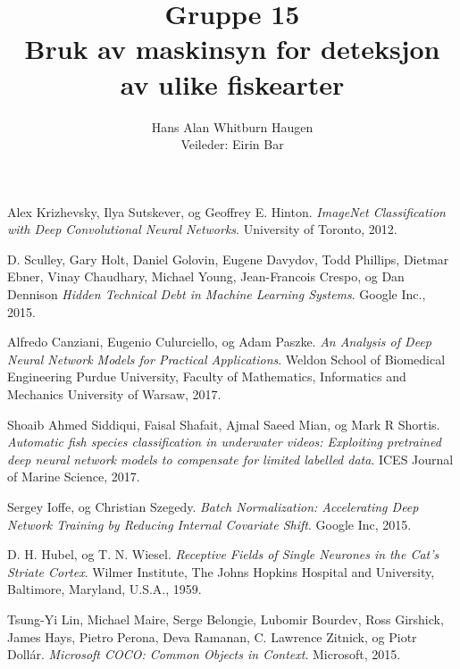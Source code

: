 \documentclass[11ot]{article}
\title{Gruppe 15\\Bruk av maskinsyn for deteksjon av ulike fiskearter}
\author{Hans Alan Whitburn Haugen\\Veileder: Eirin Bar}
\begin{document}

\newpage

\newpage

\newpage

\newpage

\tableofcontents
\clearpage
{}
\setcounter{page}{1}


%



%

\begin{thebibliography}{9}


Alex Krizhevsky, Ilya Sutskever, og Geoffrey E. Hinton. 
\textit{ImageNet Classification with Deep Convolutional Neural Networks}. 
University of Toronto, 2012.

D. Sculley, Gary Holt, Daniel Golovin, Eugene Davydov, Todd Phillips, Dietmar Ebner, Vinay Chaudhary, Michael Young, Jean-Francois Crespo, og Dan Dennison 
\textit{Hidden Technical Debt in Machine Learning Systems}. 
Google Inc., 2015.

Alfredo Canziani, Eugenio Culurciello, og Adam Paszke. 
\textit{An Analysis of Deep Neural Network Models for Practical Applications}. 
Weldon School of Biomedical Engineering Purdue University, Faculty of Mathematics, Informatics and Mechanics University of Warsaw, 2017.

Shoaib Ahmed Siddiqui, Faisal Shafait, Ajmal Saeed Mian, og Mark R Shortis. 
\textit{Automatic fish species classification in underwater videos: Exploiting pretrained deep neural network models to compensate for limited labelled data}. 
ICES Journal of Marine Science, 2017.

Sergey Ioffe, og Christian Szegedy. 
\textit{Batch Normalization: Accelerating Deep Network Training by Reducing Internal Covariate Shift}. 
Google Inc, 2015.

D. H. Hubel, og T. N. Wiesel. 
\textit{Receptive Fields of Single Neurones in the Cat's Striate Cortex}. 
 Wilmer Institute, The Johns Hopkins Hospital and University, Baltimore, Maryland, U.S.A., 1959.

Tsung-Yi Lin, Michael Maire, Serge Belongie, Lubomir Bourdev, Ross Girshick, James Hays, Pietro Perona, Deva Ramanan, C. Lawrence Zitnick, og Piotr Dollár. 
\textit{Microsoft COCO: Common Objects in Context}. 
Microsoft, 2015.


\end{thebibliography}
\end{document}
